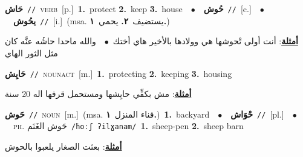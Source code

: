 \documentclass[10pt,a4paper,twoside]{article} %
\begin{document}
\begin{multicols}{2}
{\setlength\topsep{0pt}\textbf{\foreignlanguage{arabic}{حَاش}}\ {\color{gray}\texttt{//}\color{black}}\ \textsc{verb}\ [p.]\ \textbf{1.}~protect  \textbf{2.}~keep  \textbf{3.}~house\ \ $\bullet$\ \ \setlength\topsep{0pt}\textbf{\foreignlanguage{arabic}{حُوش}}\ {\color{gray}\texttt{//}\color{black}}\ [c.]\ \ $\bullet$\ \ \setlength\topsep{0pt}\textbf{\foreignlanguage{arabic}{يحُوش}}\ {\color{gray}\texttt{//}\color{black}}\ [i.]\ \color{gray}(msa. \foreignlanguage{arabic}{يستضيف}~\foreignlanguage{arabic}{\textbf{٢.}}  \foreignlanguage{arabic}{يحمي}~\foreignlanguage{arabic}{\textbf{١.}})\color{black}\  \begin{flushright}\color{gray}\foreignlanguage{arabic}{\textbf{\underline{\foreignlanguage{arabic}{أمثلة}}}: أنت أولى تْحوشها هي وولادها بالأخير هاي أختك\ $\bullet$\ \  والله ماحدا حاشُه عنَّه كان مثل الثور الهاي}\end{flushright}\color{black}} \vspace{2mm}

{\setlength\topsep{0pt}\textbf{\foreignlanguage{arabic}{حَايِش}}\ {\color{gray}\texttt{//}\color{black}}\ \textsc{noun\textunderscore act}\ [m.]\ \textbf{1.}~protecting  \textbf{2.}~keeping  \textbf{3.}~housing\  \begin{flushright}\color{gray}\foreignlanguage{arabic}{\textbf{\underline{\foreignlanguage{arabic}{أمثلة}}}: مش بكفِّي حايِشها ومستحمل قرفها اله 20 سنة}\end{flushright}\color{black}} \vspace{2mm}

{\setlength\topsep{0pt}\textbf{\foreignlanguage{arabic}{حَوش}}\ {\color{gray}\texttt{//}\color{black}}\ \textsc{noun}\ [m.]\ \color{gray}(msa. \foreignlanguage{arabic}{فناء المنزل}~\foreignlanguage{arabic}{\textbf{١.}})\color{black}\ \textbf{1.}~backyard\ \ $\bullet$\ \ \setlength\topsep{0pt}\textbf{\foreignlanguage{arabic}{حْوَاش}}\ {\color{gray}\texttt{//}\color{black}}\ [pl.]\ \ $\bullet$\ \ \textsc{ph.} \color{gray} \foreignlanguage{arabic}{حَوش الغَنَم}\color{black}\ {\color{gray}\texttt{/{\sffamily ħoːʃ ʔilɣanam}/}\color{black}}\ \textbf{1.}~sheep-pen  \textbf{2.}~sheep barn\  \begin{flushright}\color{gray}\foreignlanguage{arabic}{\textbf{\underline{\foreignlanguage{arabic}{أمثلة}}}: بعثت الصغار يلعبوا بالحوش}\end{flushright}\color{black}} \vspace{2mm}


\end{multicols}
\end{document}
